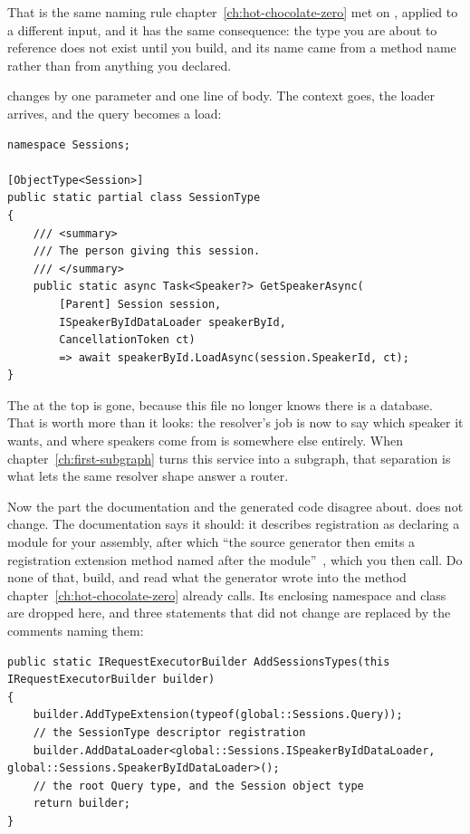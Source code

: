 That is the same naming rule chapter~\ref{ch:hot-chocolate-zero} met on
, applied to a different input, and it has the same
consequence: the type you are about to reference does not exist until you
build, and its name came from a method name rather than from anything you
declared.

%
 changes by one parameter and one line of body. The
context goes, the loader arrives, and the query becomes a load:

\begin{verbatim}
namespace Sessions;

[ObjectType<Session>]
public static partial class SessionType
{
    /// <summary>
    /// The person giving this session.
    /// </summary>
    public static async Task<Speaker?> GetSpeakerAsync(
        [Parent] Session session,
        ISpeakerByIdDataLoader speakerById,
        CancellationToken ct)
        => await speakerById.LoadAsync(session.SpeakerId, ct);
}
\end{verbatim}

%
The  at the top is gone, because
this file no longer knows there is a database. That is worth more than it
looks: the resolver's job is now to say which speaker it wants, and where
speakers come from is somewhere else entirely. When
chapter~\ref{ch:first-subgraph} turns this service into a subgraph, that
separation is what lets the same resolver shape answer a router.

%
Now the part the documentation and the generated code disagree about.
 does not change. The documentation says it should: it
describes registration as declaring a module for your assembly, after which
\enquote{the source generator then emits a registration extension method named
after the module}~\autocite{chillicreamdataloader}, which you then call. Do
none of that, build, and read what the generator wrote into the method
chapter~\ref{ch:hot-chocolate-zero} already calls. Its enclosing namespace and
class are dropped here, and three statements that did not change are replaced
by the comments naming them:

\begin{verbatim}
public static IRequestExecutorBuilder AddSessionsTypes(this IRequestExecutorBuilder builder)
{
    builder.AddTypeExtension(typeof(global::Sessions.Query));
    // the SessionType descriptor registration
    builder.AddDataLoader<global::Sessions.ISpeakerByIdDataLoader, global::Sessions.SpeakerByIdDataLoader>();
    // the root Query type, and the Session object type
    return builder;
}
\end{verbatim}

